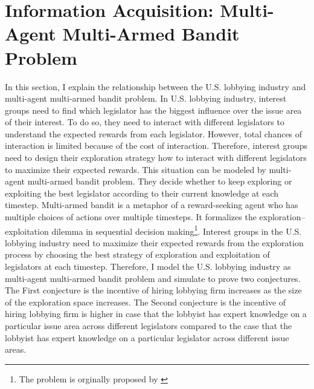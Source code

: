 \documentclass{article}
\begin{document}


\section{Information Acquisition: Multi-Agent Multi-Armed Bandit Problem}

In this section, I explain 
the relationship between 
the U.S. lobbying industry
and multi-agent multi-armed bandit problem.
In U.S. lobbying industry, interest groups 
need to find which legislator
has the biggest influence over the issue area 
of their interest.
To do so,
they need to interact with different legislators 
to understand the expected rewards from each legislator.
However, total chances of interaction is limited 
because of the cost of interaction.
Therefore, interest groups 
need to design their 
exploration strategy
how to interact with different legislators
to maximize their expected rewards.
This situation can be modeled by multi-agent multi-armed bandit problem.
They decide 
whether to 
keep exploring or 
exploiting the best legislator according to their current knowledge
at each timestep.
Multi-armed bandit 
is a metaphor of a reward-seeking agent 
who has multiple choices of actions over multiple timesteps.
It formalizes the exploration–exploitation dilemma 
in sequential decision making\footnote{The problem is orginally 
proposed by \cite{Robbins1952SomeAO}
}.
Interest groups in the U.S. lobbying industry
need to maximize their expected rewards from the exploration process
by choosing the best strategy of exploration and exploitation of legislators at each timestep.
Therefore, 
I model the U.S. lobbying industry as multi-agent multi-armed bandit problem
and simulate to prove two conjectures. 
The First conjecture is  
the incentive of hiring lobbying firm increases
as the size of the exploration space increases.
The Second conjecture is
the incentive of hiring lobbying firm is higher in 
case that the lobbyist has expert knowledge on a 
particular issue area across different legislators
compared to the case that 
the lobbyist has expert knowledge 
on a particular legislator across different issue areas.
\end{document}

